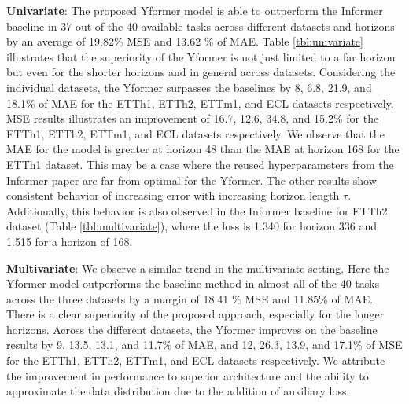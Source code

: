 \textbf{Univariate}: The proposed Yformer model is able to outperform the Informer baseline in 37 out of the 40 available tasks across different datasets and horizons by an average of 19.82\% MSE and 13.62 \% of MAE. Table \ref{tbl:univariate} illustrates that the superiority of the Yformer is not just limited to a far horizon but even for the shorter horizons and in general across datasets.  Considering the individual datasets, the Yformer surpasses the baselines by 8, 6.8, 21.9, and 18.1\% of MAE for the ETTh1, ETTh2, ETTm1, and ECL datasets respectively. MSE results illustrates an improvement of 16.7, 12.6, 34.8, and 15.2\% for the ETTh1, ETTh2, ETTm1, and ECL datasets respectively. We observe that the MAE for the model is greater at horizon 48 than the MAE at horizon 168 for the ETTh1 dataset. This may be a case where the reused hyperparameters from the Informer paper are far from optimal for the Yformer. The other results show consistent behavior of increasing error with increasing horizon length $\tau$. Additionally, this behavior is also observed in the Informer baseline for ETTh2 dataset (Table \ref{tbl:multivariate}), where the loss is 1.340 for horizon 336 and 1.515 for a horizon of 168. 

\textbf{Multivariate}: We observe a similar trend in the multivariate setting. Here the Yformer model outperforms the baseline method in almost all of the 40 tasks across the three datasets by a margin of 18.41 \% MSE and 11.85\% of MAE. There is a clear superiority of the proposed approach, especially for the longer horizons. Across the different datasets, the Yformer improves on the baseline results by 9, 13.5, 13.1, and 11.7\% of MAE, and 12, 26.3, 13.9, and 17.1\% of MSE  for the ETTh1, ETTh2, ETTm1, and ECL datasets respectively. We attribute the improvement in performance to superior architecture and the ability to approximate the data distribution due to the addition of auxiliary loss. 
